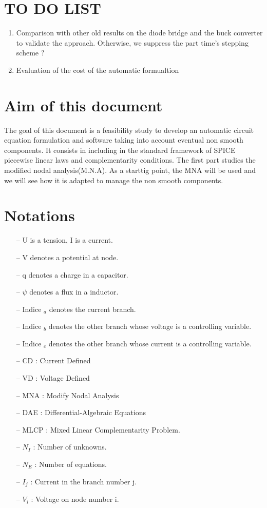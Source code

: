 
\newpage
\tableofcontents
\newpage
\section*{TO DO LIST}
\begin{enumerate}
\item Comparison with other old results on the diode bridge and the buck converter to validate the approach. Otherwise, we suppress the part time's stepping scheme ?
\item Evaluation of the cost of the automatic formualtion
\end{enumerate}
 \newpage
 \section{Aim of this document}
 The goal of this document is a feasibility study to develop an automatic circuit equation
 formulation and software taking into account eventual non smooth components. It consists in including in the standard framework of SPICE piecewise linear laws  and complementarity conditions. The first part studies the modified nodal analysis(M.N.A). As a starttig point, the
 MNA will be used and we will see how it is adapted to manage the non smooth components.
 \section{Notations}
\begin{itemize}
  \item[--] U is a tension, I is a current.
  \item[--] V denotes a potential at node.
  \item[--] q denotes a charge in a capacitor.
  \item[--] $\psi$ denotes a flux in a inductor.
  \item[--] Indice $_{a}$ denotes the current branch.
  \item[--] Indice $_{b}$ denotes the other branch whose voltage is a controlling variable.
  \item[--] Indice $_{c}$ denotes the other branch whose current is a controlling variable.
\item[--] CD : Current Defined
\item[--] VD : Voltage Defined
\item[--] MNA : Modify Nodal Analysis
\item[--] DAE : Differential-Algebraic Equations
\item[--] MLCP : Mixed Linear Complementarity Problem.
\item[--] $N_{I}$ : Number of unknowns.
\item[--] $N_{E}$ : Number of equations.
\item[--] $I_{j}$ : Current in the branch number j.
\item[--] $V_{i}$ : Voltage on node number i. 
\end{itemize}



